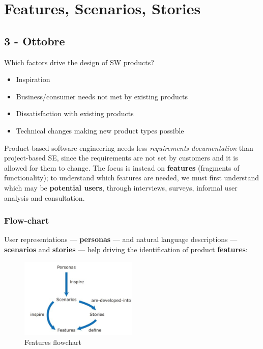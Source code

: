 \chapter{Features, Scenarios, Stories}

\section*{3 - Ottobre}
Which factors drive the design of SW products?
\begin{itemize}
    \item {\color{gray}Inspiration}
    \item Business/consumer needs not met by existing products
    \item Dissatisfaction with existing products
    \item Technical changes making new product types possible
\end{itemize}

Product-based software engineering needs less \textit{requirements documentation} than project-based SE, 
since the requirements are not set by customers and it is allowed for them to change.
The focus is instead on \textbf{features} (fragments of functionality); 
to understand which features are needed, we must first understand which may be \textbf{potential users}, through interviews, surveys, informal user analysis and consultation.

\subsection*{Flow-chart}
User representations {---} \textbf{personas} {---} and natural language descriptions {---} \textbf{scenarios} and \textbf{stories} {---} help driving the identification of product \textbf{features}:
\begin{figure}[h]
    \centering
    \includegraphics[width=0.5\textwidth]{images/features_flow.png}
    \caption{Features flowchart}
    \label{fig:features_flowchart}
\end{figure}

